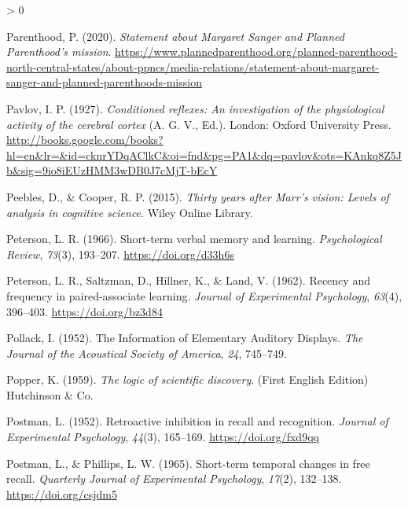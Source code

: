\documentclass[
  oneside,
  12pt]{crumpbook}
\newlength{\cslhangindent}
\newenvironment{CSLReferences}[2] %
 {%
  \setlength{\parindent}{0pt}
  \ifodd #1 \everypar{\setlength{\hangindent}{\cslhangindent}}\ignorespaces\fi
  \ifnum #2 > 0
  \setlength{\parskip}{#2\baselineskip}
  \fi
 }%
 {}
\begin{document}
\begin{CSLReferences}{1}{0}
\leavevmode\hypertarget{ref-plannedparenthoodStatementMargaretSanger2020}{}%
Parenthood, P. (2020). \emph{Statement about {Margaret Sanger} and {Planned Parenthood}'s mission}. \url{https://www.plannedparenthood.org/planned-parenthood-north-central-states/about-ppncs/media-relations/statement-about-margaret-sanger-and-planned-parenthoods-mission}

\leavevmode\hypertarget{ref-pavlovConditionedReflexesInvestigation1927}{}%
Pavlov, I. P. (1927). \emph{Conditioned reflexes: {An} investigation of the physiological activity of the cerebral cortex} (A. G. V., Ed.). {London: Oxford University Press}. \url{http://books.google.com/books?hl=en\&lr=\&id=cknrYDqAClkC\&oi=fnd\&pg=PA1\&dq=pavlov\&ots=KAnkq8Z5Jb\&sig=9io8iEUzHMM3wDB0J7cMjT-bEcY}

\leavevmode\hypertarget{ref-peeblesThirtyYearsMarr2015}{}%
Peebles, D., \& Cooper, R. P. (2015). \emph{Thirty years after {Marr}'s vision: {Levels} of analysis in cognitive science}. {Wiley Online Library}.

\leavevmode\hypertarget{ref-petersonShorttermVerbalMemory1966}{}%
Peterson, L. R. (1966). Short-term verbal memory and learning. \emph{Psychological Review}, \emph{73}(3), 193--207. \url{https://doi.org/d33h6s}

\leavevmode\hypertarget{ref-petersonRecencyFrequencyPairedassociate1962}{}%
Peterson, L. R., Saltzman, D., Hillner, K., \& Land, V. (1962). Recency and frequency in paired-associate learning. \emph{Journal of Experimental Psychology}, \emph{63}(4), 396--403. \url{https://doi.org/bz3d84}

\leavevmode\hypertarget{ref-pollackInformationElementaryAuditory1952a}{}%
Pollack, I. (1952). The {Information} of {Elementary Auditory Displays}. \emph{The Journal of the Acoustical Society of America}, \emph{24}, 745--749.

\leavevmode\hypertarget{ref-popperLogicScientificDiscovery1959}{}%
Popper, K. (1959). \emph{The logic of scientific discovery}. {(First English Edition) Hutchinson \& Co}.

\leavevmode\hypertarget{ref-postmanRetroactiveInhibitionRecall1952}{}%
Postman, L. (1952). Retroactive inhibition in recall and recognition. \emph{Journal of Experimental Psychology}, \emph{44}(3), 165--169. \url{https://doi.org/fxd9qq}

\leavevmode\hypertarget{ref-postmanShorttermTemporalChanges1965}{}%
Postman, L., \& Phillips, L. W. (1965). Short-term temporal changes in free recall. \emph{Quarterly Journal of Experimental Psychology}, \emph{17}(2), 132--138. \url{https://doi.org/csjdm5}


\end{CSLReferences}
\end{document}
